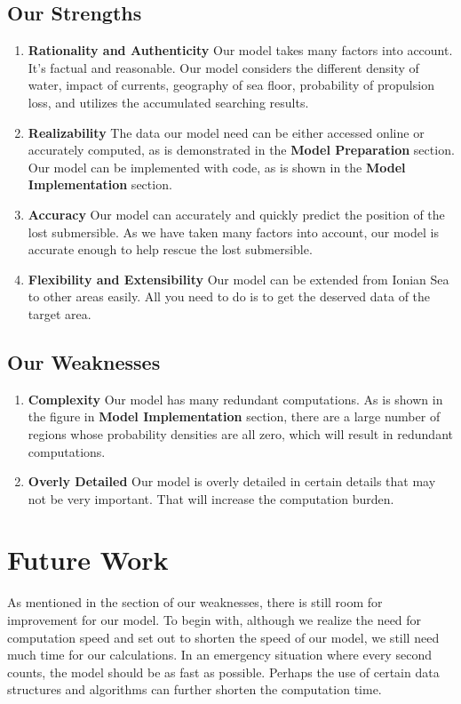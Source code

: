 \documentclass[12pt]{article}
\begin{document}
\subsection{Our Strengths}
\begin{enumerate}[\bfseries 1.]
    \setlength{\parsep}{0ex} %
    \setlength{\topsep}{0.5pt} %
    \setlength{\itemsep}{0.5pt} %
    \item \textbf{Rationality and Authenticity} Our model takes many factors into account. It's factual and reasonable. Our model considers the different density of water, impact of currents, geography of sea floor, probability of propulsion loss, and utilizes the accumulated searching results. 
    \item \textbf{Realizability} The data our model need can be either accessed online or accurately computed, as is demonstrated in the \textbf{Model Preparation} section. Our model can be implemented with code, as is shown in the \textbf{Model Implementation} section. 
    \item \textbf{Accuracy} Our model can accurately and quickly predict the position of the lost submersible. As we have taken many factors into account, our model is accurate enough to help rescue the lost submersible.
    \item  \textbf{Flexibility and Extensibility} Our model can be extended from Ionian Sea to other areas easily. All you need to do is to get the deserved data of the target area.
\end{enumerate}
\subsection{Our Weaknesses}
\begin{enumerate}[\bfseries 1.]
    \setlength{\parsep}{0ex}
    \setlength{\topsep}{0.5pt}
    \setlength{\itemsep}{0.5pt}
    \item \textbf{Complexity} Our model has many redundant computations. As is shown in the figure in \textbf{Model Implementation} section, there are a large number of regions whose probability densities are all zero, which will result in redundant computations.
    \item \textbf{Overly Detailed} Our model is overly detailed in certain details that may not be very important. That will increase the computation burden.
\end{enumerate}
\section{Future Work}
As mentioned in the section of our weaknesses, there is still room for improvement for our model. To begin with, although we realize the need for computation speed and set out to shorten the speed of our model, we still need much time for our calculations. In an emergency situation where every second counts, the model should be as fast as possible. Perhaps the use of certain data structures and algorithms can further shorten the computation time.
\end{document}
